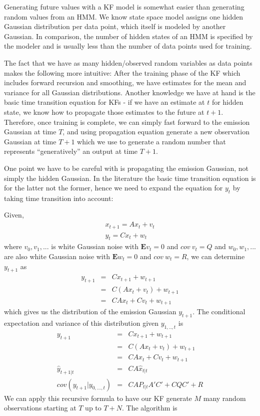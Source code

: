 Generating future values with a KF model is somewhat easier than generating
random values from an HMM. We know state space model assigns one hidden Gaussian
distribution per data point, which itself is modeled by another Gaussian. In
comparison, the number of hidden states of an HMM is specified by the modeler
and is usually less than the number of data points used for training.

The fact that we have as many hidden/observed random variables as data points
makes the following more intuitive: After the training phase of the KF which
includes forward recursion and smoothing, we have estimates for the mean and
variance for all Gaussian distributions. Another knowledge we have at hand is
the basic time transition equation for KFs - if we have an estimate at $t$ for
hidden state, we know how to propagate those estimates to the future at
$t+1$. Therefore, once training is complete, we can simply fast forward to the
emission Gaussian at time $T$, and using propagation equation generate a new
observation Gaussian at time $T+1$ which we use to generate a random number that
represents ``generatively'' an output at time $T+1$.

One point we have to be careful with is propagating the emission Gaussian, not
simply the hidden Gaussian. In the literature the basic time transition equation
is for the latter not the former, hence we need to expand the equation for $y_t$
by taking time transition into account:

Given,
\begin{eqnarray}
x_{t+1} = Ax_t + v_t \\
y_t = Cx_t + w_t
\end{eqnarray}
where $v_0,v_1,...$ is white Gaussian noise with $\mathbf{E}v_t = 0$ and $cov \:
v_t = Q$ and $w_0,w_1,...$ are also white Gaussian noise with $\mathbf{E}w_t =
0$ and $cov \: w_t = R$, we can determine $y_{t+1}$ as
\begin{eqnarray}
y_{t+1} &=& Cx_{t+1} + w_{t+1}\\
&=& C(Ax_t + v_t) + w_{t+1} \\
&=& CAx_t + Cv_t + w_{t+1}
\end{eqnarray}
which gives us the distribution of the emission Gaussian $y_{t+1}$. The
conditional expectation and variance of this distribution given $y_{1,..,t}$ is
\begin{eqnarray}
y_{t+1} &=& Cx_{t+1} + w_{t+1}\\
&=& C(Ax_t + v_t) + w_{t+1} \\
&=& CAx_t + Cv_t + w_{t+1} \\
\hat{y}_{t+1|t} &=& CA\hat{x}_{t|t} \\
cov(y_{t+1}|y_{0,...,t}) &=& CA P_{t|t}A'C' + CQC' + R
\end{eqnarray}
We can apply this recursive formula to have our KF generate $M$ many random
observations starting at $T$ up to $T+N$. The algorithm is

